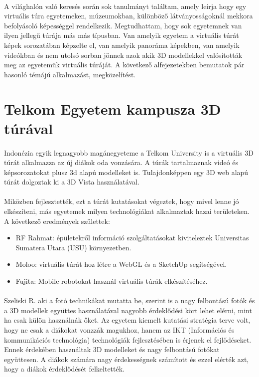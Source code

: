 \paragraph{}
A világhalón való keresés során sok tanulmányt találtam, amely leírja hogy egy virtuális túra egyetemeken, múzeumokban, különböző látványosságoknál mekkora befolyásoló képességgel rendelkezik. Megtudhattam, hogy sok egyetemnek van ilyen jellegű túrája más más típusban. Van amelyik egyetem a virtuális túrát képek sorozatában képzelte el, van amelyik panoráma képekben, van amelyik videókban és nem utolsó sorban jönnek azok akik 3D modellekkel valósították meg az egyetemük virtuális túráját. A következő alfejezetekben bemutatok pár hasonló témájú alkalmazást, megközelítést.

\section{Telkom Egyetem kampusza 3D túrával}
\paragraph{}
Indonézia egyik legnagyobb magánegyeteme a Telkom University \cite{perdana2019implementation} is a virtuális 3D túrát alkalmazza az új diákok oda vonzására. A túrák tartalmaznak videó és képsorozatokat plusz 3d alapú modelleket is. Tulajdonképpen egy 3D web alapú túrát dolgoztak ki a 3D Vista használatával.
\paragraph{}
Miközben fejlesztették, ezt a túrát kutatásokat végeztek, hogy mivel lenne jó elkészíteni, más egyetemek milyen technológiákat alkalmaztak hazai területeken. A következő eredmények születtek: 
\begin{itemize}
	\item RF Rahmat: épületekről információ szolgáltatásokat kiviteleztek Universitas Sumatera Utara (USU) környezetben.
	\item Moloo: virtuális túrát hoz létre a WebGL és a SketchUp segítségével.
	\item Fujita: Mobile robotokat használ virtuális túrák elkészítéséhez.
	
\end{itemize}
\paragraph{}
Szeliski R. aki a fotó technikákat mutatta be, szerint is a nagy felbontású fotók és a 3D modellek együttes használatával nagyobb érdeklődési kört lehet elérni, mint ha csak külön használnák őket. 
Az egyetem kiemelt kutatási stratégia terve volt, hogy ne csak a diákokat vonzzák magukhoz, hanem az IKT (Információs és kommunikációs technológia) technológiák fejlesztésében is érjenek el fejlődéseket. Ennek érdekében használtak 3D modelleket és nagy felbontású fotókat együttesen. A diákok számára nagy érdekességnek számított és ezzel elérték azt, hogy a diákok érdeklődését felkeltették.

